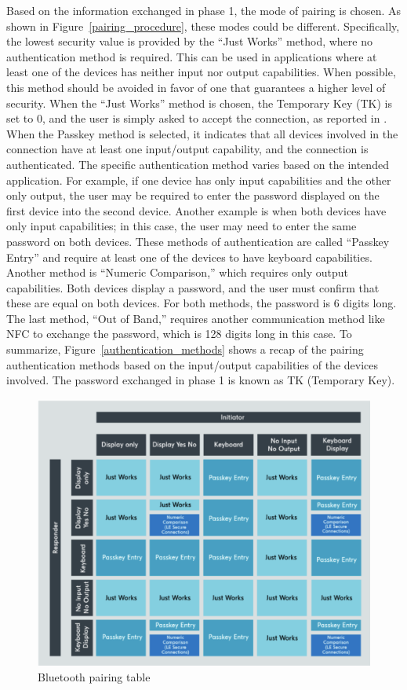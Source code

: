 \documentclass{Configuration_Files/PoliMi3i_thesis}
\begin{document}
Based on the information exchanged in phase 1, the mode of pairing is chosen. As shown in Figure~\ref{pairing_procedure}, these modes could be different. Specifically, the lowest security value is provided by the “Just Works” method, where no authentication method is required. This can be used in applications where at least one of the devices has neither input nor output capabilities. When possible, this method should be avoided in favor of one that guarantees a higher level of security. When the “Just Works” method is chosen, the Temporary Key (TK) is set to 0, and the user is simply asked to accept the connection, as reported in \cite{nordic_academy}. When the Passkey method is selected, it indicates that all devices involved in the connection have at least one input/output capability, and the connection is authenticated. The specific authentication method varies based on the intended application. For example, if one device has only input capabilities and the other only output, the user may be required to enter the password displayed on the first device into the second device. Another example is when both devices have only input capabilities; in this case, the user may need to enter the same password on both devices. These methods of authentication are called “Passkey Entry” and require at least one of the devices to have keyboard capabilities. Another method is “Numeric Comparison,” which requires only output capabilities. Both devices display a password, and the user must confirm that these are equal on both devices. For both methods, the password is 6 digits long. The last method, “Out of Band,” requires another communication method like NFC to exchange the password, which is 128 digits long in this case. To summarize, Figure~\ref{authentication_methods} shows a recap of the pairing authentication methods based on the input/output capabilities of the devices involved. The password exchanged in phase 1 is known as TK (Temporary Key).

\begin{figure}[H]
    \centering
    \includegraphics[scale=0.7]{Bluetooth_Security/3.png}
    \caption{Bluetooth pairing table}
    \label{bluetooth_sec_3}
\end{figure}
\end{document}
